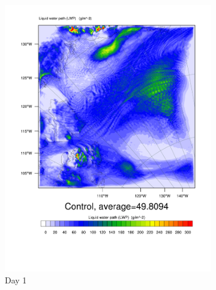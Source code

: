 \begin{figure}
    \centering
    \begin{subfigure}{0.48\textwidth}
        \centering
        \includegraphics[width=\textwidth]{results/control/LWP_Day1.pdf}
        \caption{Day 1}
        \label{subfig:LWPr1Day1}
    \end{subfigure}
    \begin{subfigure}{0.48\textwidth}
        \centering

\end{subfigure}
\end{figure}
